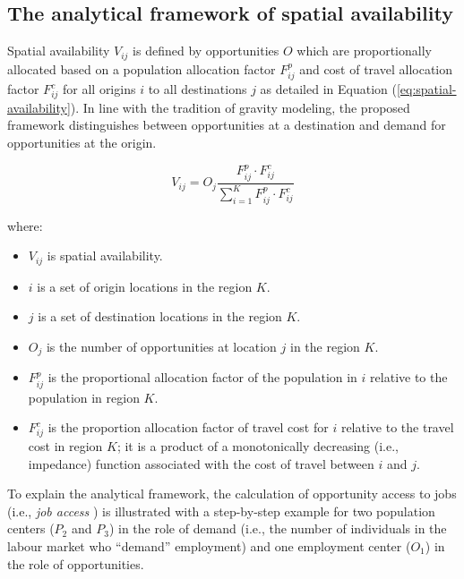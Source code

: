 \documentclass[]{elsarticle} %
\providecommand{\tightlist}{%
  \setlength{\itemsep}{0pt}\setlength{\parskip}{0pt}}
\begin{document}
\hypertarget{the-analytical-framework-of-spatial-availability}{%
\subsection{The analytical framework of spatial
availability}\label{the-analytical-framework-of-spatial-availability}}

Spatial availability \(V_{ij}\) is defined by opportunities \(O\) which
are proportionally allocated based on a population allocation factor
\(F^p_{ij}\) and cost of travel allocation factor \(F^c_{ij}\) for all
origins \(i\) to all destinations \(j\) as detailed in Equation
(\ref{eq:spatial-availability}). In line with the tradition of gravity
modeling, the proposed framework distinguishes between opportunities at
a destination and demand for opportunities at the origin.

\begin{equation}
\label{eq:spatial-availability}
V_{ij} = O_j\frac{F^p_{ij} \cdot F^c_{ij}}{\sum_{i=1}^K F^p_{ij} \cdot F^c_{ij}}
\end{equation}

\noindent where:

\begin{itemize}
\tightlist
\item
  \(V_{ij}\) is spatial availability.
\item
  \(i\) is a set of origin locations in the region \(K\).
\item
  \(j\) is a set of destination locations in the region \(K\).
\item
  \(O_j\) is the number of opportunities at location \(j\) in the region
  \(K\).
\item
  \(F^p_{ij}\) is the proportional allocation factor of the population
  in \(i\) relative to the population in region \(K\).
\item
  \(F^c_{ij}\) is the proportion allocation factor of travel cost for
  \(i\) relative to the travel cost in region \(K\); it is a product of
  a monotonically decreasing (i.e., impedance) function associated with
  the cost of travel between \(i\) and \(j\).
\end{itemize}

To explain the analytical framework, the calculation of opportunity
access to jobs (i.e., \emph{job access} ) is illustrated with a
step-by-step example for two population centers (\(P_2\) and \(P_3\)) in
the role of demand (i.e., the number of individuals in the labour market
who ``demand'' employment) and one employment center (\(O_1\)) in the
role of opportunities.
\end{document}
